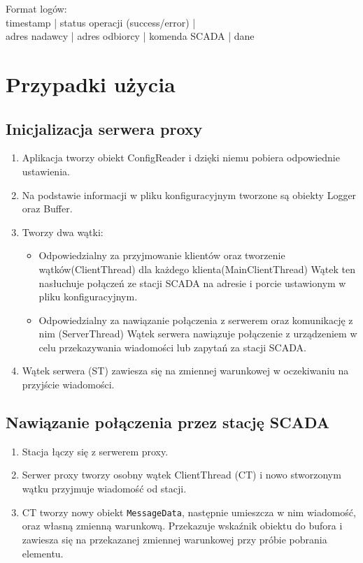 \documentclass[a4paper]{article}
\begin{document}
Format logów:\\
timestamp | status operacji (success/error) |\\adres nadawcy | adres odbiorcy | komenda SCADA | dane


\section{Przypadki użycia}
\subsection{Inicjalizacja serwera proxy}
\begin{enumerate}
\item Aplikacja tworzy obiekt ConfigReader i dzięki niemu pobiera odpowiednie ustawienia.
\item Na podstawie informacji w pliku konfiguracyjnym tworzone są obiekty Logger oraz Buffer.
\item Tworzy dwa wątki:
\begin{itemize}
\item Odpowiedzialny za przyjmowanie klientów oraz tworzenie wątków(ClientThread) dla każdego klienta(MainClientThread)
Wątek ten nasłuchuje połączeń ze stacji SCADA na adresie i porcie ustawionym w pliku konfiguracyjnym.
\item Odpowiedzialny za nawiązanie połączenia z serwerem oraz komunikację z nim (ServerThread)
Wątek serwera nawiązuje połączenie z urządzeniem w celu przekazywania wiadomości lub zapytań za stacji SCADA.
\end{itemize}
\item Wątek serwera (ST) zawiesza się na zmiennej warunkowej w oczekiwaniu na przyjście wiadomości.
\end{enumerate}

\subsection{Nawiązanie połączenia przez stację SCADA}
\begin{enumerate}
\item Stacja łączy się z serwerem proxy.
\item Serwer proxy tworzy osobny wątek ClientThread (CT) i nowo stworzonym wątku przyjmuje wiadomość od stacji.
\item CT tworzy nowy obiekt \texttt{MessageData}, następnie umieszcza w nim wiadomość, oraz własną zmienną warunkową. Przekazuje wskaźnik obiektu do bufora i zawiesza się na przekazanej zmiennej warunkowej przy próbie pobrania elementu.
\end{enumerate}
\end{document}
